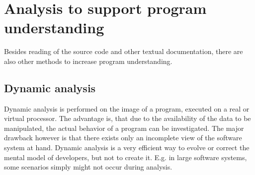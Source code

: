 \section{Analysis to support program understanding}

Besides reading of the source code and other textual documentation, there are also other methods to increase program understanding.

\subsection{Dynamic analysis}

Dynamic analysis is performed on the image of a program, executed on a real or virtual processor. The advantage is, that due to the availability of the data to be manipulated, the actual behavior of a program can be investigated. The major drawback however is that there exists only an incomplete view of the software system at hand\cite{Ball:1999:CDA:318774.318944}. Dynamic analysis is a very efficient way to evolve or correct the mental model of developers, but not to create it. E.g. in large software systems, some scenarios simply might not occur during analysis.

